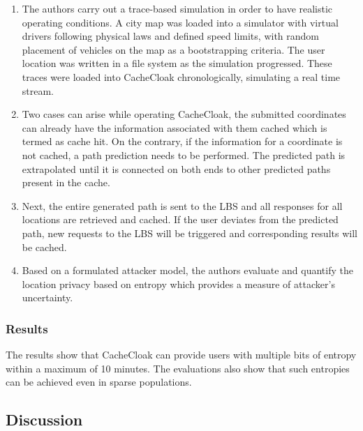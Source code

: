 \begin{enumerate}
	\item The authors carry out a trace-based simulation in order to have realistic operating
	 conditions. A city map was loaded into a simulator with virtual drivers following physical laws
	 and defined speed limits, with random placement of vehicles on the map as a bootstrapping
	 criteria. The user location was written in a file system as the simulation progressed. These
	 traces were loaded into CacheCloak chronologically, simulating a real time stream.
	 
	 \item Two cases can arise while operating CacheCloak, the submitted coordinates can already
	 have the information associated with them cached which is termed as cache hit. On the contrary, 
	 if the information for a coordinate is not cached, a path prediction needs to be performed. The
	 predicted path is extrapolated until it is connected on both ends to other predicted paths 
	 present in the cache. 
	 
	 \item Next, the entire generated path is sent to the LBS and all responses for all locations
	 are retrieved and cached. If the user deviates from the predicted path, new requests to the 
	 LBS will be triggered and corresponding results will be cached. 
	 
	 \item Based on a formulated attacker model, the authors evaluate and quantify the location 
	 privacy based on entropy which provides a measure of attacker's uncertainty. 
	
	
\end{enumerate}

\subsubsection*{Results}

The results show that CacheCloak can provide users with multiple bits
of entropy within a maximum of 10 minutes. The evaluations also show that
such entropies can be achieved even in sparse populations. 

\subsection*{Discussion} 

